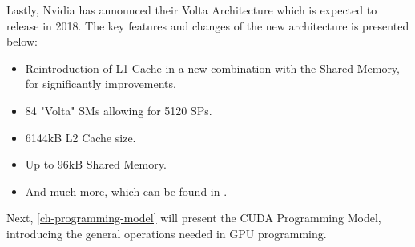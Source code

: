 Lastly, Nvidia has announced their Volta Architecture \cite{Nvidia2017} which is expected to release in 2018.
The key features and changes of the new architecture is presented below:
\begin{itemize}
	\item Reintroduction of L1 Cache in a new combination with the Shared Memory, for significantly improvements.
	\item 84 "Volta" SMs allowing for 5120 SPs.
	\item 6144kB L2 Cache size.
	\item Up to 96kB Shared Memory.
	\item And much more, which can be found in \cite{Nvidia2017}.
\end{itemize}

Next, \cref{ch-programming-model} will present the CUDA Programming Model, introducing the general operations needed in GPU programming. 
